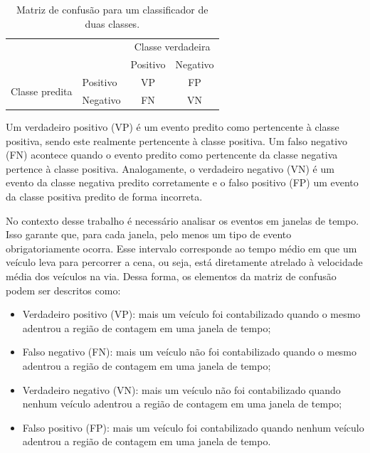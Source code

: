 \begin{table}[ht]
  \caption{Matriz de confusão para um classificador de duas classes.}
  \label{tab:matriz_de_confusao}
  \begin{center}
    \begin{tabular}{l|l|c|c|}

    \multicolumn{2}{c}{} & \multicolumn{2}{c}{Classe verdadeira} \\
    \cline{3-4}
    \multicolumn{2}{c|}{} & Positivo & Negativo \\
    \cline{2-4}
    \multirow{2}{*}{Classe predita} & Positivo & VP & FP \\
    \cline{2-4}
    & Negativo & FN & VN \\
    \cline{2-4}
    
    \end{tabular}
  \end{center}
\end{table}

Um verdadeiro positivo (VP) é um evento predito como pertencente à classe positiva, sendo este realmente pertencente à classe positiva. Um falso negativo (FN) acontece quando o evento predito como pertencente da classe negativa pertence à classe positiva. Analogamente, o verdadeiro negativo (VN) é um evento da classe negativa predito corretamente e o falso positivo (FP) um evento da classe positiva predito de forma incorreta.


No contexto desse trabalho é necessário analisar os eventos em janelas de tempo. Isso garante que, para cada janela, pelo menos um tipo de evento obrigatoriamente ocorra. Esse intervalo corresponde ao tempo médio em que um veículo leva para percorrer a cena, ou seja, está diretamente atrelado à velocidade média dos veículos na via. Dessa forma, os elementos da matriz de confusão podem ser descritos como:

\begin{itemize}
  \item Verdadeiro positivo (VP): mais um veículo foi contabilizado quando o mesmo adentrou a região de contagem em uma janela de tempo;
  \item Falso negativo (FN): mais um veículo não foi contabilizado quando o mesmo adentrou a região de contagem em uma janela de tempo;
  \item Verdadeiro negativo (VN): mais um veículo não foi contabilizado quando nenhum veículo adentrou a região de contagem em uma janela de tempo;
  \item Falso positivo (FP): mais um veículo foi contabilizado quando nenhum veículo adentrou a região de contagem em uma janela de tempo.
\end{itemize}

